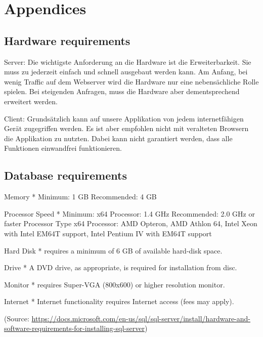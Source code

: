 \chapter{Appendices}

\section{Hardware requirements}
Server:
Die wichtigste Anforderung an die Hardware ist die Erweiterbarkeit. Sie muss zu jederzeit einfach und schnell ausgebaut werden kann. Am Anfang, bei wenig Traffic auf dem Webserver wird die Hardware nur eine nebensächliche Rolle spielen. Bei steigenden Anfragen, muss die Hardware aber dementsprechend erweitert werden.

Client:
Grundsätzlich kann auf unsere Applikation von jedem internetfähigen Gerät zugegriffen werden. Es ist aber empfohlen nicht mit veralteten Browsern die Applikation zu nutzten. Dabei kann nicht garantiert werden, dass alle Funktionen einwandfrei funktionieren. 


\section{Database requirements}

Memory *
Minimum: 1 GB
Recommended:  4 GB

Processor Speed	*
Minimum: x64 Processor: 1.4 GHz
Recommended: 2.0 GHz or faster Processor Type	x64 Processor: AMD Opteron, AMD Athlon 64, Intel Xeon with Intel EM64T support, Intel Pentium IV with EM64T support

Hard Disk *	
requires a minimum of 6 GB of available hard-disk space.

Drive *	
A DVD drive, as appropriate, is required for installation from disc.

Monitor *	
requires Super-VGA (800x600) or higher resolution monitor.

Internet *	
Internet functionality requires Internet access (fees may apply).

(Source: \url{https://docs.microsoft.com/en-us/sql/sql-server/install/hardware-and-software-requirements-for-installing-sql-server})
